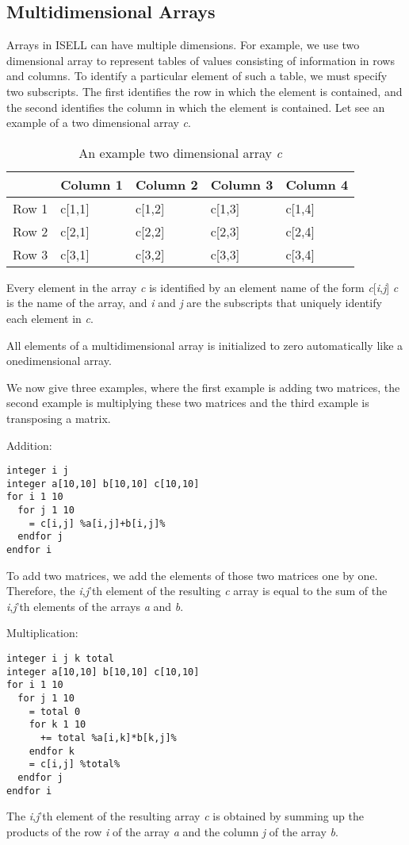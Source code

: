 \documentclass[a4paper,12pt]{book}
\begin{document}
\subsection{Multidimensional Arrays}
Arrays in ISELL can have multiple dimensions. For example, we use two dimensional array to represent
tables of values consisting of information in rows and columns. To identify a particular
element of such a table, we must specify two subscripts. The first identifies the row
in which the element is contained, and the second identifies the column in which the element
is contained. Let see an example of a two dimensional array \textsl{c}.

\begin{table}[ht]
\label{ex-twoarray}
\caption{An example two dimensional array \textsl{c}}
\begin{tabular}{lllll}
\hline
 & Column 1 & Column 2 & Column 3 & Column 4 \\
\hline
Row 1 & c[1,1] & c[1,2] & c[1,3] & c[1,4] \\
Row 2 & c[2,1] & c[2,2] & c[2,3] & c[2,4] \\
Row 3 & c[3,1] & c[3,2] & c[3,3] & c[3,4] \\
\hline
\end{tabular}
\end{table}

Every element in the array \textsl{c} is identified by an element name of the form \textsl{c}[\textsl{i},\textsl{j}] \textsl{c} is the name of the array, and \textsl{i} and \textsl{j} are the subscripts that uniquely identify each element in \textsl{c}.

All elements of a multidimensional array is initialized to zero automatically like a onedimensional array. 

We now give three examples, where the first example is adding two matrices, the second example is multiplying these two matrices and the third example is transposing a matrix.

\noindent
Addition:
\begin{verbatim}
integer i j
integer a[10,10] b[10,10] c[10,10]
for i 1 10
  for j 1 10
    = c[i,j] %a[i,j]+b[i,j]%
  endfor j
endfor i
\end{verbatim}
To add two matrices, we add the elements of those two matrices one by one. Therefore, the \textsl{i},\textsl{j}'th element of the resulting \textsl{c} array is equal to the sum of the \textsl{i},\textsl{j}'th elements of the arrays \textsl{a} and \textsl{b}.

\noindent
Multiplication:
\begin{verbatim}
integer i j k total
integer a[10,10] b[10,10] c[10,10]
for i 1 10
  for j 1 10
    = total 0
    for k 1 10
      += total %a[i,k]*b[k,j]%
    endfor k
    = c[i,j] %total%
  endfor j
endfor i
\end{verbatim}
The \textsl{i},\textsl{j}'th element of the resulting array \textsl{c} is obtained by summing up the products of the row \textsl{i} of the array \textsl{a} and the column \textsl{j} of the array \textsl{b}.
\end{document}
